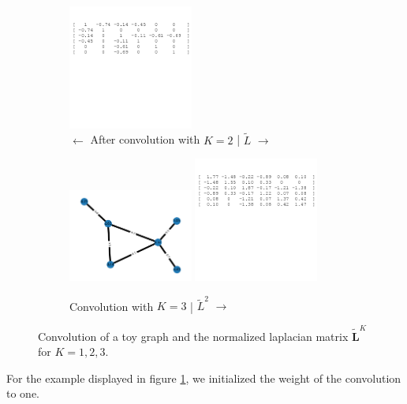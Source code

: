 \begin{figure}
\begin{subfigure}{0.45\textwidth}
        \includegraphics[width=0.45\textwidth]{figures/lap1.png}
        \caption{$\leftarrow$ After convolution with $K=2$ | $\tilde{L}$ $\rightarrow$}
    \end{subfigure}
    \hfill
    \begin{subfigure}{0.45\textwidth}
        \centering
        \includegraphics[width=0.45\textwidth]{figures/toy_graph_conv_K3.png}
        \includegraphics[width=0.45\textwidth]{figures/lap2.png}
        \caption{Convolution with $K=3$ | $\tilde{L}^2$ $\rightarrow$ }
    \end{subfigure}
    \caption{Convolution of a toy graph and the normalized laplacian matrix $\widetilde{\mathbf{L}}^K$ for $K=1, 2, 3$.}
    \label{fig:toyGraph}
 \end{figure}
For the example displayed in figure \ref{fig:toyGraph}, we initialized the weight of the convolution to one.

